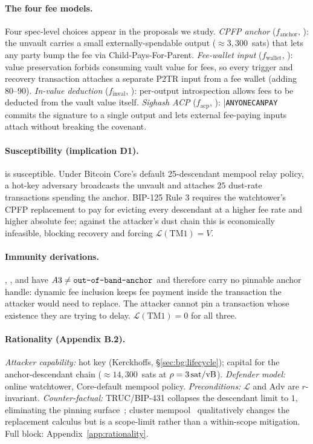 \paragraph{The four fee models.} Four spec-level choices appear in
the proposals we study. \emph{CPFP anchor} ($f_{\text{anchor}}$,
\opctv{}): the unvault carries a small externally-spendable output
(${\approx}3{,}300$~sats) that lets any party bump the fee via
Child-Pays-For-Parent. \emph{Fee-wallet input} ($f_{\text{wallet}}$,
\opvault{}): value preservation forbids consuming vault value for
fees, so every trigger and recovery transaction attaches a separate
P2TR input from a fee wallet (adding 80--90\vB{}). \emph{In-value
deduction} ($f_{\text{inval}}$, \opccv{}): per-output introspection
allows fees to be deducted from the vault value itself. \emph{Sighash
ACP} ($f_{\text{acp}}$, \catcsfs{}): |\texttt{ANYONECANPAY}
commits the signature to a single output and lets external
fee-paying inputs attach without breaking the covenant.

\paragraph{Susceptibility (implication D1).} \opctv{} is susceptible.
Under Bitcoin Core's default 25-descendant mempool relay policy, a
hot-key adversary broadcasts the unvault and attaches $25$ dust-rate
transactions spending the anchor. BIP-125 Rule 3 requires the
watchtower's CPFP replacement to pay for evicting every descendant
at a higher fee rate and higher absolute fee; against the attacker's
dust chain this is economically infeasible, blocking recovery and
forcing $\mathcal{L}(\mathrm{TM1}) = V$.

\paragraph{Immunity derivations.} \opccv{}, \opvault{}, and \catcsfs{}
have $A3{} \neq \texttt{out-of-band-anchor}$ and therefore carry
no pinnable anchor handle: dynamic fee inclusion keeps fee payment
inside the transaction the attacker would need to replace. The
attacker cannot pin a transaction whose existence they are trying to
delay. $\mathcal{L}(\mathrm{TM1}) = 0$ for all three.

\paragraph{Rationality (Appendix B.2).} \emph{Attacker capability:}
hot key (Kerckhoffs, §\ref{sec:bg:lifecycle}); capital for the
anchor-descendant chain ($\approx 14{,}300$~sats at $\rho = 3\text{\,sat/vB}$).
\emph{Defender model:} online watchtower, Core-default mempool
policy. \emph{Preconditions:} $\mathcal{L}$ and $\mathrm{Adv}$ are
$r$-invariant. \emph{Counter-factual:} TRUC/BIP-431 collapses the
descendant limit to $1$, eliminating the pinning
surface~\cite{TRUC}; cluster mempool~\cite{ClusterMempool}
qualitatively changes the replacement calculus but is a scope-limit
rather than a within-scope mitigation. Full block:
Appendix~\ref{app:rationality}.

